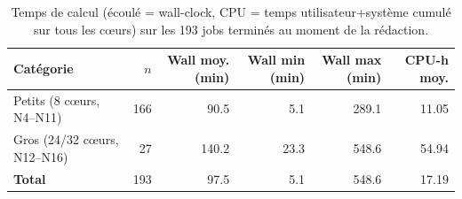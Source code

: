 \begin{table}[H]
\caption{Temps de calcul (\'ecoul\'e = wall-clock, CPU = temps utilisateur+syst\`eme cumul\'e sur tous les c\oe urs) sur les 193 jobs termin\'es au moment de la r\'edaction.}
\label{tab:timing}
\centering
\small
\begin{tabular}{@{}lrrrrr@{}}
\toprule
Cat\'egorie & $n$ & Wall moy. (min) & Wall min (min) & Wall max (min) & CPU-h moy. \\
\midrule
Petits (8 c\oe urs, N4--N11) & 166 & 90.5 & 5.1 & 289.1 & 11.05 \\
Gros (24/32 c\oe urs, N12--N16) & 27 & 140.2 & 23.3 & 548.6 & 54.94 \\
\midrule
\textbf{Total} & 193 & 97.5 & 5.1 & 548.6 & 17.19 \\
\bottomrule
\end{tabular}
\end{table}